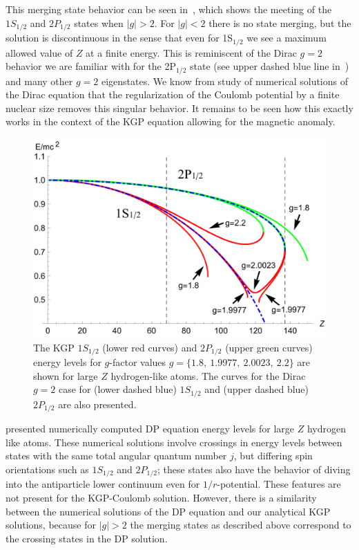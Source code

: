 This merging state behavior can be seen in~, which shows the meeting of the $1S_{1/2}$ and $2P_{1/2}$ states when $|g|\!>\!2$. For $|g|\!<\!2$ there is no state merging, but the solution is discontinuous in the sense that even for 1S$_{1/2}$ we see a maximum allowed value of $Z$ at a finite energy. This is reminiscent of the Dirac $g\!=\!2$ behavior we are familiar with for the 2P$_{1/2}$ state (see upper dashed blue line in~) and many other $g\!=\!2$ eigenstates. We know from study of numerical solutions of the Dirac equation that the regularization of the Coulomb potential by a finite nuclear size removes this singular behavior. It remains to be seen how this exactly works in the context of the KGP equation allowing for the magnetic anomaly.

\begin{figure}[ht]
    \centering
    \includegraphics[width=\linewidth]{plots/chap02moment/lanplot08.pdf}
     \caption{The KGP $1S_{1/2}$ (lower red curves) and $2P_{1/2}$ (upper green curves) energy levels for $g$-factor values $g\!=\!\{1.8,\ 1.9977,\ 2.0023,\ 2.2\}$ are shown for large $Z$ hydrogen-like atoms. The curves for the Dirac $g\!=\!2$ case for (lower dashed blue) $1S_{1/2}$ and (upper dashed blue) $2P_{1/2}$ are also presented.}
    \label{f03}
\end{figure}

\cite{Thaller:1992ji} presented numerically computed DP equation energy levels for large $Z$ hydrogen like atoms. These numerical solutions involve crossings in energy levels between states with the same total angular quantum number $j$, but differing spin orientations such as $1S_{1/2}$ and $2P_{1/2}$; these states also have the behavior of diving into the antiparticle lower continuum even for $1/r$-potential. These features are not present for the KGP-Coulomb solution. However, there is a similarity between the numerical solutions of the DP equation and our analytical KGP solutions, because for $|g|>2$ the merging states as described above correspond to the crossing states in the DP solution.

